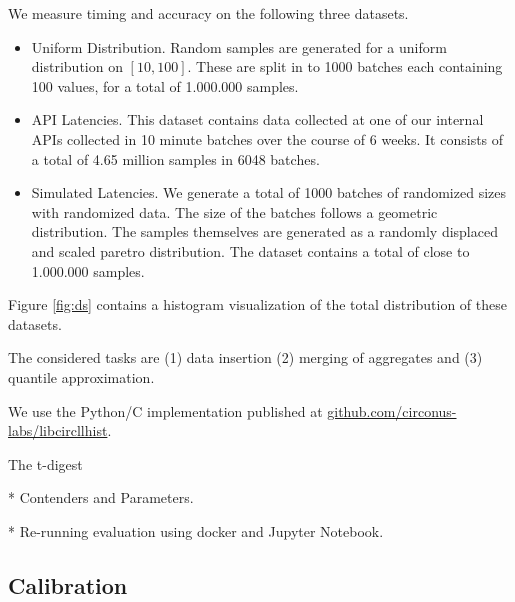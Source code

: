 \documentclass{article}
\theoremstyle{plain}
\theoremstyle{remark}
\begin{document}
{We measure timing and accuracy on the following three datasets.

\begin{itemize}
\item Uniform Distribution. Random samples are generated for a uniform distribution on $[10,100]$.
  These are split in to 1000 batches each containing 100 values, for a total of 1.000.000 samples.
\item API Latencies.  This dataset contains data collected at one of our internal APIs
  collected in 10 minute batches over the course of 6 weeks.
  It consists of a total of 4.65 million samples in 6048 batches.
\item Simulated Latencies.
  We generate a total of 1000 batches of randomized sizes with randomized data.
  The size of the batches follows a geometric distribution.
  The samples themselves are generated as a randomly displaced and scaled paretro distribution.
  The dataset contains a total of close to 1.000.000 samples.
\end{itemize}

Figure \ref{fig:ds} contains a histogram visualization of the total distribution of these datasets.



The considered tasks are (1) data insertion (2) merging of aggregates and (3) quantile approximation.


We use the Python/C implementation published at \url{github.com/circonus-labs/libcircllhist}.

The t-digest

* Contenders and Parameters.

* Re-running evaluation using docker and Jupyter Notebook.


\clearpage
\subsection{Calibration}

}
\end{document}
